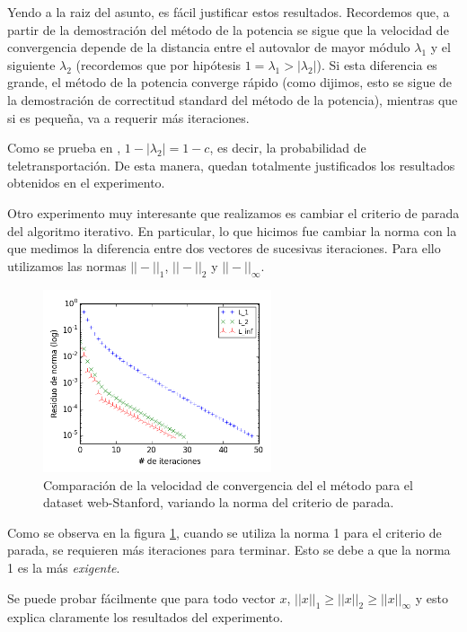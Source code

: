 Yendo a la raiz del asunto, es fácil justificar estos resultados. Recordemos que, a partir de la demostración del m\'etodo de la potencia se sigue que la velocidad de convergencia depende de la distancia entre el autovalor de mayor módulo $\lambda_1$ y el siguiente $\lambda_2$ (recordemos que por hipótesis $1 = \lambda_1 > |\lambda_2|$). 
Si esta diferencia es grande, el m\'etodo de la potencia converge rápido (como dijimos, esto se sigue de la demostración de correctitud standard del m\'etodo de la potencia), mientras que si es pequeña, va a requerir más iteraciones.

Como se prueba en \cite{Havel}, $1 - |\lambda_2| = 1 - c$, es decir, la probabilidad de teletransportación. De esta manera, quedan totalmente justificados los resultados obtenidos en el experimento.


Otro experimento muy interesante que realizamos es cambiar el criterio de parada del algoritmo iterativo. En particular, lo que hicimos fue cambiar la norma con la que medimos la diferencia entre dos vectores de sucesivas iteraciones. Para ello utilizamos las normas $||-||_1$, $||-||_2$ y $||-||_{\infty}$.

\begin{figure}[H]
\centering

    \includegraphics[width=0.6\textwidth]{imgs/convergencia-norma.png}
  \caption{\footnotesize{Comparación de la velocidad de convergencia del el método para el dataset web-Stanford, variando la norma del criterio de parada.}}
  \label{fig:conv-norma}
\end{figure}

Como se observa en la figura \ref{fig:conv-norma}, cuando se utiliza la norma 1 para el criterio de parada, se requieren más iteraciones para terminar. Esto se debe a que la norma 1 es la más \emph{exigente}. 

Se puede probar fácilmente que para todo vector $x$, $||x||_1 \geq ||x||_2 \geq ||x||_{\infty}$ y esto explica claramente los resultados del experimento.




